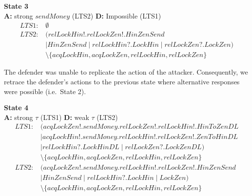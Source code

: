 \documentclass{report}
\begin{document}
\begin{mdframed}
\textbf{State 3} \\
\textbf{A:} strong $\mathit{sendMoney}$ (LTS2) \quad \textbf{D:} Impossible (LTS1)
\begin{align*}
\textit{LTS1:}\; & \emptyset \\[6pt]
\textit{LTS2:}\; & (\mathit{relLockHin!}.\mathit{relLockZen!}.\mathit{HinZenSend} \\
                 & \mid \mathit{HinZenSend} \mid \mathit{relLockHin?}.\mathit{LockHin} \mid \mathit{relLockZen?}.\mathit{LockZen}) \\
                 & \setminus \{\mathit{acqLockHin}, \mathit{acqLockZen}, \mathit{relLockHin}, \mathit{relLockZen}\}
\end{align*}
\end{mdframed}

\noindent The defender was unable to replicate the action of the attacker.  Consequently, we retrace the defender's actions to the previous state where alternative responses were possible (i.e.\ State 2).

\begin{mdframed}
\textbf{State 4} \\
\textbf{A:} strong $\tau$ (LTS1) \quad \textbf{D:} weak $\tau$ (LTS2)
\begin{align*}
\textit{LTS1:}\; & (\mathit{acqLockZen!}.\mathit{sendMoney}.\mathit{relLockZen!}.\mathit{relLockHin!}.\mathit{HinToZenDL} \\
                 & \mid \mathit{acqLockHin!}.\mathit{sendMoney}.\mathit{relLockHin!}.\mathit{relLockZen!}.\mathit{ZenToHinDL} \\
                 & \mid \mathit{relLockHin?}.\mathit{LockHinDL} \mid \mathit{relLockZen?}.\mathit{LockZenDL}) \\
                 & \setminus \{\mathit{acqLockHin}, \mathit{acqLockZen}, \mathit{relLockHin}, \mathit{relLockZen}\} \\[6pt]
\textit{LTS2:}\; & (\mathit{acqLockZen!}.\mathit{sendMoney}.\mathit{relLockHin!}.\mathit{relLockZen!}.\mathit{HinZenSend} \\
                 & \mid \mathit{HinZenSend} \mid \mathit{relLockHin?}.\mathit{LockHin} \mid \mathit{LockZen}) \\
                 & \setminus \{\mathit{acqLockHin}, \mathit{acqLockZen}, \mathit{relLockHin}, \mathit{relLockZen}\}
\end{align*}
\end{mdframed}
\end{document}
